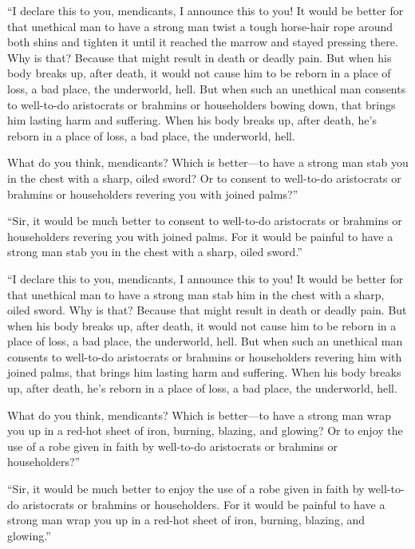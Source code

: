 \documentclass[12pt,openany]{book}%
\begin{document}
“I declare this to you, mendicants, I announce this to you! It would be better for that unethical man to have a strong man twist a tough horse-hair rope around both shins and tighten it until it reached the marrow and stayed pressing there. Why is that? Because that might result in death or deadly pain. But when his body breaks up, after death, it would not cause him to be reborn in a place of loss, a bad place, the underworld, hell. But when such an unethical man consents to well-to-do aristocrats or brahmins or householders bowing down, that brings him lasting harm and suffering. When his body breaks up, after death, he’s reborn in a place of loss, a bad place, the underworld, hell. 

What do you think, mendicants? Which is better—to have a strong man stab you in the chest with a sharp, oiled sword? Or to consent to well-to-do aristocrats or brahmins or householders revering you with joined palms?” 

“Sir, it would be much better to consent to well-to-do aristocrats or brahmins or householders revering you with joined palms. For it would be painful to have a strong man stab you in the chest with a sharp, oiled sword.” 

“I declare this to you, mendicants, I announce this to you! It would be better for that unethical man to have a strong man stab him in the chest with a sharp, oiled sword. Why is that? Because that might result in death or deadly pain. But when his body breaks up, after death, it would not cause him to be reborn in a place of loss, a bad place, the underworld, hell. But when such an unethical man consents to well-to-do aristocrats or brahmins or householders revering him with joined palms, that brings him lasting harm and suffering. When his body breaks up, after death, he’s reborn in a place of loss, a bad place, the underworld, hell. 

What do you think, mendicants? Which is better—to have a strong man wrap you up in a red-hot sheet of iron, burning, blazing, and glowing? Or to enjoy the use of a robe given in faith by well-to-do aristocrats or brahmins or householders?” 

“Sir, it would be much better to enjoy the use of a robe given in faith by well-to-do aristocrats or brahmins or householders. For it would be painful to have a strong man wrap you up in a red-hot sheet of iron, burning, blazing, and glowing.” 
\end{document}
